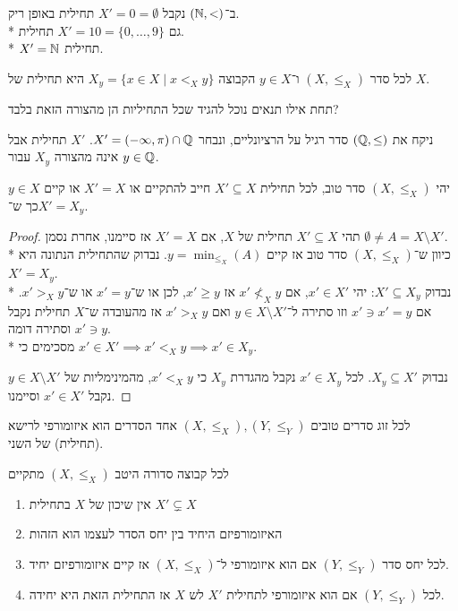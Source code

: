 \begin{example}
	ב־$(\mathbb{N}, <)$ נקבל $X' = 0 = \emptyset$ תחילית באופן ריק. \\*
	גם $X' = 10 = \{0, \dots, 9\}$ תחילית. \\*
	$X' = \mathbb{N}$ תחילית.
\end{example}
\begin{remark}
	לכל סדר $(X, \le_X)$ ו־$y \in X$ הקבוצה $X_y = \{ x \in X \mid x <_X y\}$ היא תחילית של $X$.
\end{remark}
תחת אילו תנאים נוכל להגיד שכל התחיליות הן מהצורה הזאת בלבד?
\begin{example}
	ניקח את $(\mathbb{Q}, \le)$ סדר רגיל על הרציונליים, ונבחר $X' = (-\infty, \pi) \cap \mathbb{Q}$.
	$X'$ תחילית אבל אינה מהצורה $X_y$ עבור $y \in \mathbb{Q}$.
\end{example}
\begin{proposition}
	יהי $(X, \le_X)$ סדר טוב, לכל תחילית $X' \subseteq X$ חייב להתקיים או $X' = X$ או קיים $y \in X$ כך ש־$X' = X_y$.
\end{proposition}
\begin{proof}
	תהי $X' \subseteq X$ תחילית של $X$, אם $X' = X$ אז סיימנו, אחרת נסמן $\emptyset \ne A = X \setminus X'$. \\*
	כיוון ש־$(X, \le_X)$ סדר טוב אז קיים $y = \min_{\le_X}(A)$.
	נבדוק שהתחילית הנתונה היא $X' = X_y$. \\*
	נבדוק $X' \subseteq X_y$: יהי $x' \in X'$, אם $x' \not<_X y$ אז $x' \ge y$, לכן או ש־$x' = y$ או ש־$x' >_X y$.
	אם $x' \ni x' = y$ וזו סתירה ל־$y \in X \setminus X'$ ואם $x' >_X y$ אז מהעובדה ש־$X$ תחילית נקבל $x' \ni y$ וסתירה דומה. \\*
	מסכימים כי $x' \in X' \implies x' <_X y \implies x' \in X_y$.

	נבדוק $X_y \subseteq X'$.
	לכל $x' \in X_y$ נקבל מהגדרת $X_y$ כי $x' <_X y$, מהמינימליות של $y \in X \setminus X'$ נקבל $x' \in X'$ וסיימנו.
\end{proof}
\begin{theorem}
	לכל זוג סדרים טובים $(X, \le_X), (Y, \le_Y)$ אחד הסדרים הוא איזומורפי לרישא (תחילית) של השני.
\end{theorem}
\begin{proposition}
	לכל קבוצה סדורה היטב $(X, \le_X)$ מתקיים
	\begin{enumerate}
		\item אין שיכון של $X$ בתחילית $X' \subsetneq X$
		\item האיזומורפיזם היחיד בין יחס הסדר לעצמו הוא הזהות
		\item לכל יחס סדר $(Y, \le_Y)$ אם הוא איזומורפי ל־$(X, \le_X)$ אז קיים איזומורפיזם יחיד.
		\item לכל $(Y, \le_Y)$ אם הוא איזומורפי לתחילית $X'$ לש $X$ אז התחילית הזאת היא יחידה.
	\end{enumerate}
\end{proposition}
